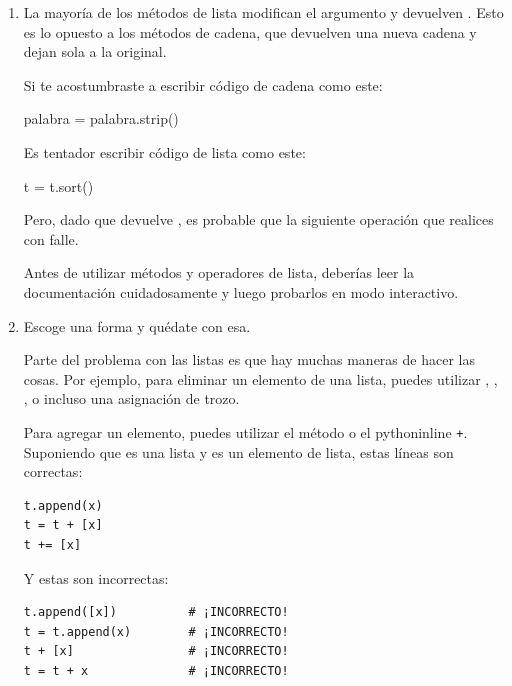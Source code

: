 \begin{enumerate}

\item La mayoría de los métodos de lista modifican el argumento y
  devuelven . Esto es lo opuesto a los métodos de cadena,
  que devuelven una nueva cadena y dejan sola a la original.

Si te acostumbraste a escribir código de cadena como este:

\begin{python}[frame=single]
palabra = palabra.strip()
\end{python}

Es tentador escribir código de lista como este:

\begin{python}[frame=single]
t = t.sort()           
\end{python}

Pero, dado que  devuelve , es probable que la
siguiente operación que realices con  falle.

Antes de utilizar métodos y operadores de lista, deberías leer la
documentación cuidadosamente y luego probarlos en modo interactivo.

\item Escoge una forma y quédate con esa.

Parte del problema con las listas es que hay muchas
maneras de hacer las cosas.  Por ejemplo, para eliminar un elemento de
una lista, puedes utilizar , , ,
o incluso una asignación de trozo.

Para agregar un elemento, puedes utilizar el método  o
el pythoninline \texttt{+}.  Suponiendo que  es una lista y
 es un elemento de lista, estas líneas son correctas:

\begin{Verbatim}[frame=single]
t.append(x)
t = t + [x]
t += [x]
\end{Verbatim}

Y estas son incorrectas:

\begin{Verbatim}[frame=single]
t.append([x])          # ¡INCORRECTO!
t = t.append(x)        # ¡INCORRECTO!
t + [x]                # ¡INCORRECTO!
t = t + x              # ¡INCORRECTO!
\end{Verbatim}


\end{enumerate}
